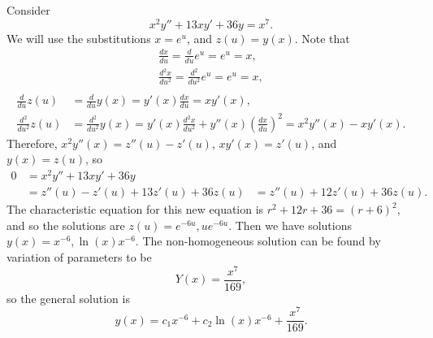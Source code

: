 \begin{exmp}
    Consider \[x^2y'' + 13xy' + 36y = x^7.\] We will use the substitutions $x = e^u$, and $z(u) = y(x)$.
    Note that
    \begin{align*}
        \frac{dx}{du} = \frac{d}{du}e^u = e^u = x, \\
        \frac{d^2x}{du^2} = \frac{d^2}{du^2}e^u = e^u = x, \\
    \end{align*}
    \begin{align*}
        \frac{d}{du}z(u) &= \frac{d}{du}y(x) = y'(x)\frac{dx}{du} = xy'(x), \\
        \frac{d^2}{du^2}z(u) &= \frac{d^2}{du^2}y(x) = y'(x)\frac{d^2x}{du^2} + y''(x)\left(\frac{dx}{du}\right)^2 = x^2y''(x) - xy'(x).
    \end{align*}
    Therefore, $x^2y''(x) = z''(u) - z'(u)$, $xy'(x) = z'(u)$, and $y(x) = z(u)$, so
    \begin{align*}
        0 &= x^2y'' + 13xy' + 36y \\
        &= z''(u) - z'(u) + 13z'(u) + 36z(u)
        &= z''(u) + 12z'(u) + 36z(u).
    \end{align*}
    The characteristic equation for this new equation is $r^2 + 12r + 36 = (r + 6)^2$, and so the solutions are $z(u) = e^{-6u}, ue^{-6u}$. Then we have solutions $y(x) = x^{-6}, \ln(x)x^{-6}$. The non-homogeneous solution can be found by variation of parameters to be
    \[Y(x) = \frac{x^7}{169},\]
    so the general solution is
    \[y(x) = c_1x^{-6} + c_2\ln(x)x^{-6} + \frac{x^7}{169}.\]
\end{exmp}

